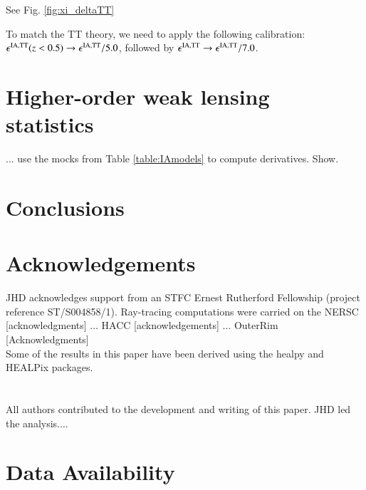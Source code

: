 \documentclass[useAMS,usenatbib]{mn2e}
\begin{document}
See Fig. \ref{fig:xi_deltaTT}

To match the TT theory, we need to apply the following calibration: $\epsilon^{\rm IA, TT}(z<0.5) \rightarrow \epsilon^{\rm IA, TT} /5.0$, followed by $\epsilon^{\rm IA, TT} \rightarrow \epsilon^{\rm IA, TT}/7.0$.






\section{Higher-order weak lensing statistics}
\label{sec:HOWLS}

... use the mocks from Table \ref{table:IAmodels} to compute derivatives. Show.


\section{Conclusions}
\label{sec:conclusion}

\section*{Acknowledgements}

JHD acknowledges support from an STFC Ernest Rutherford Fellowship (project reference ST/S004858/1). Ray-tracing computations were carried on the NERSC [acknowledgments] ... HACC [acknowledgements] ... OuterRim [Acknowledgments]
\\

Some of the results in this paper have been derived using the {\sc healpy} and {\sc HEALPix} packages.
\\
\\
\\
{\footnotesize All authors contributed to the development and writing of this paper. JHD led the analysis.... }




\section*{Data Availability}
\end{document}
